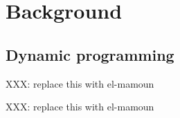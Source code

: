 

\newpage
\section{Background} \label{background}
\subsection{Dynamic programming} \label{bg_dp}

{\color{red} XXX: replace this with el-mamoun}

{\color{red} XXX: replace this with el-mamoun}

